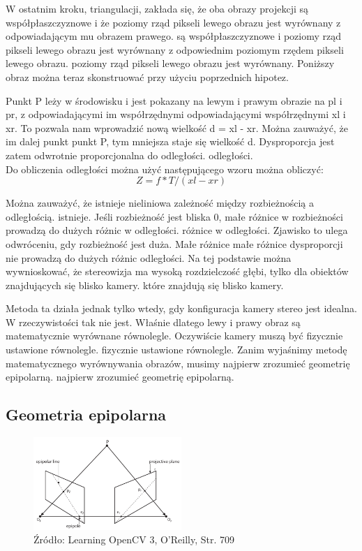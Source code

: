 \documentclass[magisterska]{pracadypl}
\begin{document}
W ostatnim kroku, triangulacji, zakłada się, że oba obrazy projekcji są współpłaszczyznowe i że poziomy rząd pikseli lewego obrazu jest wyrównany z odpowiadającym mu obrazem prawego.
są współpłaszczyznowe i poziomy rząd pikseli lewego obrazu jest wyrównany z odpowiednim poziomym rzędem pikseli lewego obrazu.
poziomy rząd pikseli lewego obrazu jest wyrównany.
Poniższy obraz można teraz skonstruować przy użyciu poprzednich hipotez.

Punkt P leży w środowisku i jest pokazany na
lewym i prawym obrazie na pl i pr, z odpowiadającymi im współrzędnymi
odpowiadającymi współrzędnymi xl i xr. To
pozwala nam wprowadzić nową wielkość
d = xl - xr. Można zauważyć, że im dalej punkt
punkt P, tym mniejsza staje się wielkość d. Dysproporcja
jest zatem odwrotnie proporcjonalna do odległości.
odległości.\\
Do obliczenia odległości można użyć następującego wzoru
można obliczyć: \[Z=f*T/(xl-xr)\]

Można zauważyć, że istnieje nieliniowa zależność między rozbieżnością a odległością.
istnieje. Jeśli rozbieżność jest bliska 0, małe różnice w rozbieżności prowadzą do dużych różnic w odległości.
różnice w odległości. Zjawisko to ulega odwróceniu, gdy rozbieżność jest duża. Małe różnice
małe różnice dysproporcji nie prowadzą do dużych różnic odległości. Na tej podstawie
można wywnioskować, że stereowizja ma wysoką rozdzielczość głębi, tylko dla obiektów znajdujących się blisko kamery.
które znajdują się blisko kamery.

Metoda ta działa jednak tylko wtedy, gdy konfiguracja kamery stereo jest idealna. W
rzeczywistości tak nie jest. Właśnie dlatego lewy i prawy obraz są
matematycznie wyrównane równolegle. Oczywiście kamery muszą być fizycznie ustawione równolegle.
fizycznie ustawione równolegle.
Zanim wyjaśnimy metodę matematycznego wyrównywania obrazów, musimy najpierw zrozumieć geometrię epipolarną.
najpierw zrozumieć geometrię epipolarną.

\subsection{Geometria epipolarna}

\begin{figure}[h]  %
    \centering  %
    \includegraphics[width=0.5\textwidth]{images/epipolar.png}  %
    \captionsetup{labelformat=empty, font=footnotesize}
    \caption{Źródło: Learning OpenCV 3, O'Reilly, Str. 709}
    \label{fig:rpi}  %
\end{figure}
\end{document}
